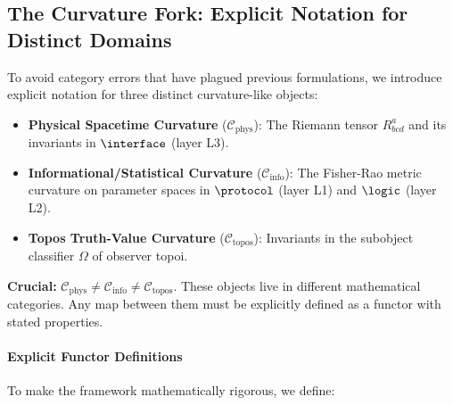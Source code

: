 
\newcommand{\Cphys}{\mathcal{C}_{\mathrm{phys}}}
\newcommand{\Cinfo}{\mathcal{C}_{\mathrm{info}}}
\newcommand{\Ctopos}{\mathcal{C}_{\mathrm{topos}}}

\subsection{The Curvature Fork: Explicit Notation for Distinct Domains}

\begin{tcolorbox}[colback=red!5!white,colframe=red!75!black,title=Critical Notation Distinction]
To avoid category errors that have plagued previous formulations, we introduce explicit notation for three distinct curvature-like objects:

\begin{itemize}
    \item \textbf{Physical Spacetime Curvature} ($\Cphys$): The Riemann tensor $R^a_{bcd}$ and its invariants in $\interface$ (layer L3).
    
    \item \textbf{Informational/Statistical Curvature} ($\Cinfo$): The Fisher-Rao metric curvature on parameter spaces in $\protocol$ (layer L1) and $\logic$ (layer L2).
    
    \item \textbf{Topos Truth-Value Curvature} ($\Ctopos$): Invariants in the subobject classifier $\Omega$ of observer topoi.
\end{itemize}

\textbf{Crucial:} $\Cphys \neq \Cinfo \neq \Ctopos$. These objects live in different mathematical categories. Any map between them must be explicitly defined as a functor with stated properties.
\end{tcolorbox}

\paragraph{Explicit Functor Definitions}
To make the framework mathematically rigorous, we define:

